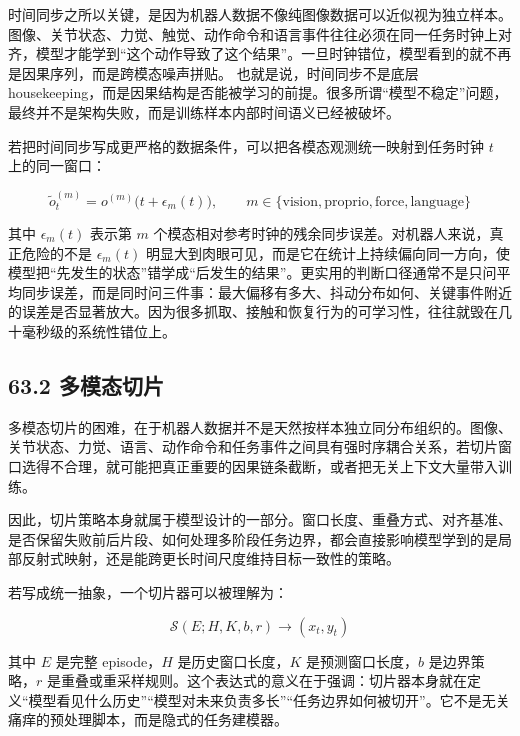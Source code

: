 时间同步之所以关键，是因为机器人数据不像纯图像数据可以近似视为独立样本。图像、关节状态、力觉、触觉、动作命令和语言事件往往必须在同一任务时钟上对齐，模型才能学到“这个动作导致了这个结果”。一旦时钟错位，模型看到的就不再是因果序列，而是跨模态噪声拼贴。 也就是说，时间同步不是底层 housekeeping，而是因果结构是否能被学习的前提。很多所谓“模型不稳定”问题，最终并不是架构失败，而是训练样本内部时间语义已经被破坏。

若把时间同步写成更严格的数据条件，可以把各模态观测统一映射到任务时钟 \(t\) 上的同一窗口：

\begingroup
\scriptsize
\begin{equation*}
\tilde{o}^{(m)}_t = o^{(m)}\bigl(t + \epsilon_m(t)\bigr), \qquad m \in \{\text{vision},\text{proprio},\text{force},\text{language}\}
\end{equation*}
\endgroup

其中 \(\epsilon_m(t)\) 表示第 \(m\) 个模态相对参考时钟的残余同步误差。对机器人来说，真正危险的不是 \(\epsilon_m(t)\) 明显大到肉眼可见，而是它在统计上持续偏向同一方向，使模型把“先发生的状态”错学成“后发生的结果”。更实用的判断口径通常不是只问平均同步误差，而是同时问三件事：最大偏移有多大、抖动分布如何、关键事件附近的误差是否显著放大。因为很多抓取、接触和恢复行为的可学习性，往往就毁在几十毫秒级的系统性错位上。

\subsection*{63.2 多模态切片}


多模态切片的困难，在于机器人数据并不是天然按样本独立同分布组织的。图像、关节状态、力觉、语言、动作命令和任务事件之间具有强时序耦合关系，若切片窗口选得不合理，就可能把真正重要的因果链条截断，或者把无关上下文大量带入训练。

因此，切片策略本身就属于模型设计的一部分。窗口长度、重叠方式、对齐基准、是否保留失败前后片段、如何处理多阶段任务边界，都会直接影响模型学到的是局部反射式映射，还是能跨更长时间尺度维持目标一致性的策略。

若写成统一抽象，一个切片器可以被理解为：

\begin{equation*}
\mathcal{S}(E; H, K, b, r) \rightarrow (x_t, y_t)
\end{equation*}

其中 \(E\) 是完整 episode，\(H\) 是历史窗口长度，\(K\) 是预测窗口长度，\(b\) 是边界策略，\(r\) 是重叠或重采样规则。这个表达式的意义在于强调：切片器本身就在定义“模型看见什么历史”“模型对未来负责多长”“任务边界如何被切开”。它不是无关痛痒的预处理脚本，而是隐式的任务建模器。

